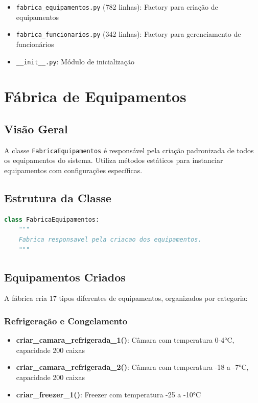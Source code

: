 \documentclass[11pt,a4paper]{article}
\begin{document}
\begin{itemize}
    \item \texttt{fabrica\_equipamentos.py} (782 linhas): Factory para criação de equipamentos
    \item \texttt{fabrica\_funcionarios.py} (342 linhas): Factory para gerenciamento de funcionários
    \item \texttt{\_\_init\_\_.py}: Módulo de inicialização
\end{itemize}

\newpage

\section{Fábrica de Equipamentos}

\subsection{Visão Geral}

A classe \texttt{FabricaEquipamentos} é responsável pela criação padronizada de todos os equipamentos do sistema. Utiliza métodos estáticos para instanciar equipamentos com configurações específicas.

\subsection{Estrutura da Classe}

\begin{tcolorbox}[colback=codebg,colframe=headerblue,title=Classe FabricaEquipamentos]
\begin{lstlisting}[language=Python]
class FabricaEquipamentos:
    """
    Fabrica responsavel pela criacao dos equipamentos.
    """
\end{lstlisting}
\end{tcolorbox}

\subsection{Equipamentos Criados}

A fábrica cria 17 tipos diferentes de equipamentos, organizados por categoria:

\subsubsection{Refrigeração e Congelamento}

\begin{itemize}[leftmargin=2cm]
    \item \textbf{criar\_camara\_refrigerada\_1()}: Câmara com temperatura 0-4°C, capacidade 200 caixas
    \item \textbf{criar\_camara\_refrigerada\_2()}: Câmara com temperatura -18 a -7°C, capacidade 200 caixas
    \item \textbf{criar\_freezer\_1()}: Freezer com temperatura -25 a -10°C
\end{itemize}
\end{document}
